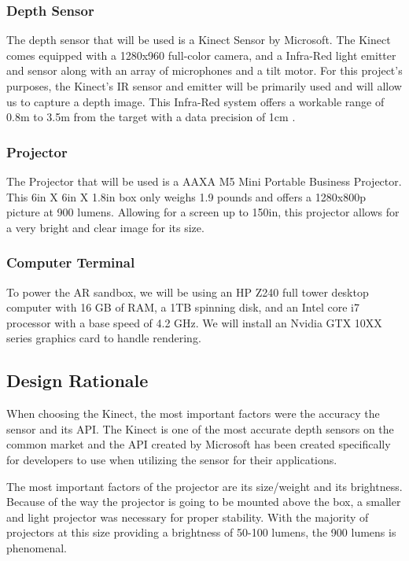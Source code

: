 \documentclass[onecolumn, draftclsnofoot,10pt, compsoc]{IEEEtran}
\begin{document}
\subsubsection{Depth Sensor}

The depth sensor that will be used is a Kinect Sensor by Microsoft.  
The Kinect comes equipped with a 1280x960 full-color camera, and a Infra-Red light emitter and sensor along with an array of microphones and a tilt motor.
For this project's purposes, the Kinect's IR sensor and emitter will be primarily used and will allow us to capture a depth image.
This Infra-Red system offers a workable range of 0.8m to 3.5m from the target with a data precision of 1cm \cite{andersen_jensen_lisouski_2012}.

\subsubsection{Projector}

The Projector that will be used is a AAXA M5 Mini Portable Business Projector.
This 6in X 6in X 1.8in box only weighs 1.9 pounds and offers a 1280x800p picture at 900 lumens.
Allowing for a screen up to 150in, this projector allows for a very bright and clear image for its size.


\subsubsection{Computer Terminal}
To power the AR sandbox, we will be using an HP Z240 full tower desktop computer with 16 GB of RAM, a 1TB spinning disk, and an Intel core i7 processor with a base speed of 4.2 GHz. We will install an Nvidia GTX 10XX series graphics card to handle rendering.

\subsection{Design Rationale}

When choosing the Kinect, the most important factors were the accuracy the sensor and its API.
The Kinect is one of the most accurate depth sensors on the common market and the API created by Microsoft has been created specifically for developers to use when utilizing the sensor for their applications.

The most important factors of the projector are its size/weight and its brightness.
Because of the way the projector is going to be mounted above the box, a smaller and light projector was necessary for proper stability.
With the majority of projectors at this size providing a brightness of 50-100 lumens, the 900 lumens is phenomenal.
\end{document}
